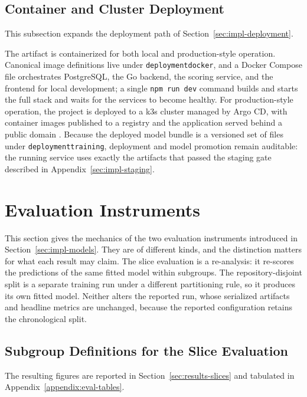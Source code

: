 \subsection{Container and Cluster Deployment}
\label{sec:appendix-impl-deployment}

This subsection expands the deployment path of Section~\ref{sec:impl-deployment}.

The artifact is containerized for both local and production-style operation. Canonical image definitions live under \texttt{deployment\sslash docker}, and a Docker Compose file orchestrates PostgreSQL, the Go backend, the scoring service, and the frontend for local development; a single \texttt{npm run dev} command builds and starts the full stack and waits for the services to become healthy. For production-style operation, the project is deployed to a k3s cluster managed by Argo CD, with container images published to a registry and the application served behind a public domain \cite{ossRiskRadarReadme}. Because the deployed model bundle is a versioned set of files under \texttt{deployment\sslash training}, deployment and model promotion remain auditable: the running service uses exactly the artifacts that passed the staging gate described in Appendix~\ref{sec:impl-staging}.

\section{Evaluation Instruments}
\label{appendix:impl-eval-instruments}

This section gives the mechanics of the two evaluation instruments introduced in Section~\ref{sec:impl-models}. They are of different kinds, and the distinction matters for what each result may claim. The slice evaluation is a re-analysis: it re-scores the predictions of the same fitted model within subgroups. The repository-disjoint split is a separate training run under a different partitioning rule, so it produces its own fitted model. Neither alters the reported run, whose serialized artifacts and headline metrics are unchanged, because the reported configuration retains the chronological split.

\subsection{Subgroup Definitions for the Slice Evaluation}
\label{sec:impl-slice-evaluation}

The resulting figures are reported in Section~\ref{sec:results-slices} and tabulated in Appendix~\ref{appendix:eval-tables}.

